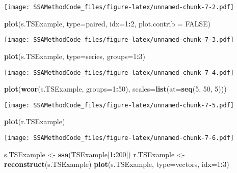 \documentclass[
]{article}
\newenvironment{Shaded}{\begin{snugshade}}{\end{snugshade}}
\newcommand{\AttributeTok}[1]{\textcolor[rgb]{0.13,0.29,0.53}{#1}}
\newcommand{\ConstantTok}[1]{\textcolor[rgb]{0.56,0.35,0.01}{#1}}
\newcommand{\DecValTok}[1]{\textcolor[rgb]{0.00,0.00,0.81}{#1}}
\newcommand{\FunctionTok}[1]{\textcolor[rgb]{0.13,0.29,0.53}{\textbf{#1}}}
\newcommand{\NormalTok}[1]{#1}
\newcommand{\OtherTok}[1]{\textcolor[rgb]{0.56,0.35,0.01}{#1}}
\newcommand{\SpecialCharTok}[1]{\textcolor[rgb]{0.81,0.36,0.00}{\textbf{#1}}}
\newcommand{\StringTok}[1]{\textcolor[rgb]{0.31,0.60,0.02}{#1}}
\begin{document}
\texttt{[image: SSAMethodCode\_files/figure-latex/unnamed-chunk-7-2.pdf]}

\begin{Shaded}
\begin{Highlighting}[]
\FunctionTok{plot}\NormalTok{(s.TSExample, }\AttributeTok{type=}\StringTok{\textquotesingle{}paired\textquotesingle{}}\NormalTok{, }\AttributeTok{idx=}\DecValTok{1}\SpecialCharTok{:}\DecValTok{2}\NormalTok{, }\AttributeTok{plot.contrib =} \ConstantTok{FALSE}\NormalTok{)}
\end{Highlighting}
\end{Shaded}

\texttt{[image: SSAMethodCode\_files/figure-latex/unnamed-chunk-7-3.pdf]}

\begin{Shaded}
\begin{Highlighting}[]
\FunctionTok{plot}\NormalTok{(s.TSExample, }\AttributeTok{type=}\StringTok{\textquotesingle{}series\textquotesingle{}}\NormalTok{, }\AttributeTok{groups=}\DecValTok{1}\SpecialCharTok{:}\DecValTok{3}\NormalTok{)}
\end{Highlighting}
\end{Shaded}

\texttt{[image: SSAMethodCode\_files/figure-latex/unnamed-chunk-7-4.pdf]}

\begin{Shaded}
\begin{Highlighting}[]
\FunctionTok{plot}\NormalTok{(}\FunctionTok{wcor}\NormalTok{(s.TSExample, }\AttributeTok{groups=}\DecValTok{1}\SpecialCharTok{:}\DecValTok{50}\NormalTok{), }\AttributeTok{scales=}\FunctionTok{list}\NormalTok{(}\AttributeTok{at=}\FunctionTok{seq}\NormalTok{(}\DecValTok{5}\NormalTok{, }\DecValTok{50}\NormalTok{, }\DecValTok{5}\NormalTok{)))}
\end{Highlighting}
\end{Shaded}

\texttt{[image: SSAMethodCode\_files/figure-latex/unnamed-chunk-7-5.pdf]}

\begin{Shaded}
\begin{Highlighting}[]
\FunctionTok{plot}\NormalTok{(r.TSExample)}
\end{Highlighting}
\end{Shaded}

\texttt{[image: SSAMethodCode\_files/figure-latex/unnamed-chunk-7-6.pdf]}

\begin{Shaded}
\begin{Highlighting}[]
\NormalTok{s.TSExample }\OtherTok{\textless{}{-}} \FunctionTok{ssa}\NormalTok{(TSExample[}\DecValTok{1}\SpecialCharTok{:}\DecValTok{200}\NormalTok{])}
\NormalTok{r.TSExample }\OtherTok{\textless{}{-}} \FunctionTok{reconstruct}\NormalTok{(s.TSExample)}
\FunctionTok{plot}\NormalTok{(s.TSExample, }\AttributeTok{type=}\StringTok{\textquotesingle{}vectors\textquotesingle{}}\NormalTok{, }\AttributeTok{idx=}\DecValTok{1}\SpecialCharTok{:}\DecValTok{3}\NormalTok{)}
\end{Highlighting}
\end{Shaded}
\end{document}

